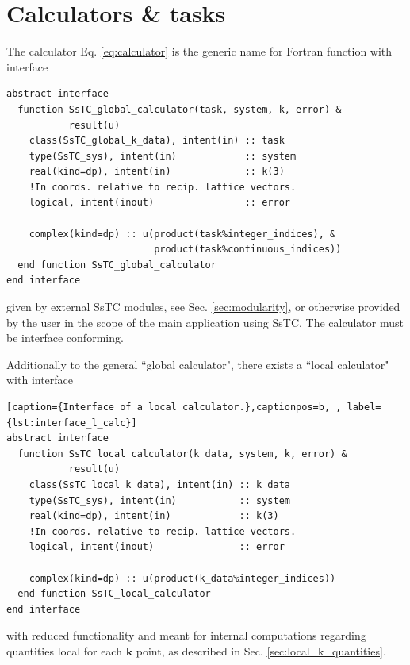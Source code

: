 \documentclass[10pt,a4paper]{article}
\begin{document}
\section{Calculators \& tasks}
The calculator Eq. \eqref{eq:calculator} is the generic name for Fortran function with interface
\begin{codebox}{}
\begin{lstlisting}[caption={Interface of a global calculator.},captionpos=b, label={lst:interface_g_calc}]
abstract interface
  function SsTC_global_calculator(task, system, k, error) &
           result(u)
    class(SsTC_global_k_data), intent(in) :: task
    type(SsTC_sys), intent(in)            :: system
    real(kind=dp), intent(in)             :: k(3)
    !In coords. relative to recip. lattice vectors.
    logical, intent(inout)                :: error

    complex(kind=dp) :: u(product(task%integer_indices), &
                          product(task%continuous_indices))
  end function SsTC_global_calculator
end interface
\end{lstlisting}
\end{codebox}
given by external SsTC modules, see Sec. \ref{sec:modularity}, or otherwise provided by the user in the scope of the main application using SsTC. The calculator must be interface conforming.

Additionally to the general ``global calculator", there exists a ``local calculator" with interface
\begin{codebox}{}
\begin{lstlisting}[caption={Interface of a local calculator.},captionpos=b, , label={lst:interface_l_calc}]
abstract interface
  function SsTC_local_calculator(k_data, system, k, error) &
           result(u)
    class(SsTC_local_k_data), intent(in) :: k_data
    type(SsTC_sys), intent(in)           :: system
    real(kind=dp), intent(in)            :: k(3)
    !In coords. relative to recip. lattice vectors.
    logical, intent(inout)               :: error

    complex(kind=dp) :: u(product(k_data%integer_indices))
  end function SsTC_local_calculator
end interface
\end{lstlisting}
\end{codebox}
with reduced functionality and meant for internal computations regarding quantities local for each $\bm{k}$ point, as described in Sec. \ref{sec:local_k_quantities}.
\end{document}
